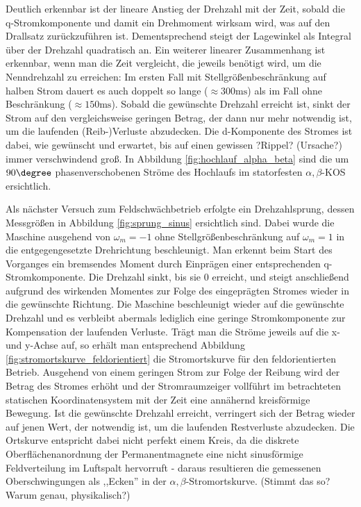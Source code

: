 \noindent Deutlich erkennbar ist der lineare Anstieg der Drehzahl mit der Zeit, sobald die q-Stromkomponente und damit ein Drehmoment wirksam wird, was auf den Drallsatz zurückzuführen ist. Dementsprechend steigt der Lagewinkel als Integral über der Drehzahl quadratisch an. Ein weiterer linearer Zusammenhang ist erkennbar, wenn man die Zeit vergleicht, die jeweils benötigt wird, um die Nenndrehzahl zu erreichen: Im ersten Fall mit Stellgrößenbeschränkung auf halben Strom dauert es auch doppelt so lange ($\approx 300 \si{\milli\second}$) als im Fall ohne Beschränkung ($\approx 150 \si{\milli\second}$). Sobald die gewünschte Drehzahl erreicht ist, sinkt der Strom auf den vergleichsweise geringen Betrag, der dann nur mehr notwendig ist, um die laufenden (Reib-)Verluste abzudecken. Die d-Komponente des Stromes ist dabei, wie gewünscht und erwartet, bis auf einen gewissen ?Rippel? (Ursache?) immer verschwindend groß.
%
In Abbildung \ref{fig:hochlauf_alpha_beta} sind die um $90\degree$ phasenverschobenen Ströme des Hochlaufs im statorfesten $\alpha,\beta$-KOS ersichtlich. 




\noindent Als nächster Versuch zum Feldschwächbetrieb erfolgte ein Drehzahlsprung, dessen Messgrößen in Abbildung \ref{fig:sprung_sinus} ersichtlich sind. Dabei wurde die Maschine ausgehend von $\omega_m=-1$ ohne Stellgrößenbeschränkung auf $\omega_m=1$ in die entgegengesetzte Drehrichtung beschleunigt. Man erkennt beim Start des Vorganges ein bremsendes Moment durch Einprägen einer entsprechenden q-Stromkomponente. Die Drehzahl sinkt, bis sie 0 erreicht, und steigt anschließend aufgrund des wirkenden Momentes zur Folge des eingeprägten Stromes wieder in die gewünschte Richtung. Die Maschine beschleunigt wieder auf die gewünschte Drehzahl und es verbleibt abermals lediglich eine geringe Stromkomponente zur Kompensation der laufenden Verluste. Trägt man die Ströme jeweils auf die x- und y-Achse auf, so erhält man entsprechend Abbildung \ref{fig:stromortskurve_feldorientiert} die Stromortskurve für den feldorientierten Betrieb. Ausgehend von einem geringen Strom zur Folge der Reibung wird der Betrag des Stromes erhöht und der Stromraumzeiger vollführt im betrachteten statischen Koordinatensystem mit der Zeit eine annähernd kreisförmige Bewegung. Ist die gewünschte Drehzahl erreicht, verringert sich der Betrag wieder auf jenen Wert, der notwendig ist, um die laufenden Restverluste abzudecken. Die Ortskurve entspricht dabei nicht perfekt einem Kreis, da die diskrete Oberflächenanordnung der Permanentmagnete eine nicht sinusförmige Feldverteilung im Luftspalt hervorruft - daraus resultieren die gemessenen Oberschwingungen als ,,Ecken'' in der $\alpha,\beta$-Stromortskurve. (Stimmt das so? Warum genau, physikalisch?)

